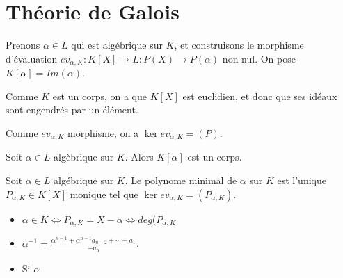 \chapter{Théorie de Galois}

\begin{definition} 
	
\end{definition}


Prenons $\alpha \in L$ qui est algébrique sur $K$, et construisons le morphisme
d'évaluation $ev_{\alpha, K} : K[X] \rightarrow L : P(X) \rightarrow P(\alpha)$
non nul. On pose $K[\alpha] = Im(\alpha)$.

Comme $K$ est un corps, on a que $K[X]$ est euclidien, et donc que ses idéaux
sont engendrés par un élément.

Comme $ev_{\alpha, K}$ morphisme, on a $\ker{ev_{\alpha, K}} = (P)$.

\begin{proposition}
	Soit $\alpha \in L$ algèbrique sur $K$. Alors $K[\alpha]$ est un corps.
\end{proposition}

\begin{definition} 
	Soit $\alpha \in L$ algébrique sur $K$. Le polynome minimal de $\alpha$ sur
	$K$ est l'unique $P_{\alpha, K} \in K[X]$ monique tel que $\ker{ev_{\alpha,
	K}} = (P_{\alpha, K})$.
\end{definition}

\begin{remarque}
	\begin{itemize}
		\item $\alpha \in K \Leftrightarrow P_{\alpha, K} = X - \alpha
			\Leftrightarrow deg(P_{\alpha, K}$
		\item $\alpha^{-1} = \frac{\alpha^{n-1} + \alpha^{n-1} a_{n-2} + \cdots
			+ a_{1}}{-a_{0}}$.
		\item Si $\alpha$
	\end{itemize}
\end{remarque}
